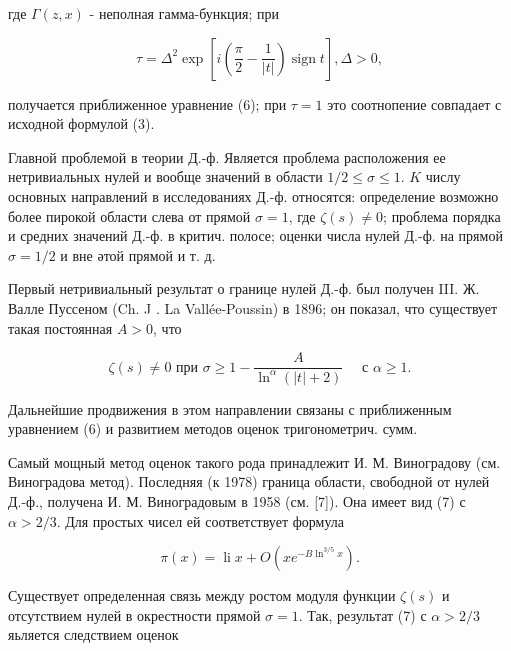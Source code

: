 \documentclass[10pt]{article}
\begin{document}
где $\Gamma(z, x)$ - неполная гамма-бункция; при



\[

\tau=\Delta^{2} \exp \left[i\left(\frac{\pi}{2}-\frac{1}{|t|}\right) \operatorname{sign} t\right], \Delta>0,

\]



получается приближенное уравнение (6); при $\tau=1$ это соотнопение совпадает с исходной формулой (3).



Главной проблемой в теории Д.-ф. Является проблема расположения ее нетривиальных нулей и вообще значений в области $1 / 2 \leqslant \sigma \leqslant 1$. $K$ числу основных направлений в исследованиях Д.-ф. относятся: определение возможно более пирокой области слева от прямой $\sigma=1$, где $\zeta(s) \neq 0$; проблема порядка и средних значений Д.-ф. в критич. полосе; оценки числа нулей Д.-ф. на прямой $\sigma=1 / 2$ и вне әтой прямой и т. д.



Первый нетривиальный результат о границе нулей Д.-ф. был получен III. Ж. Валле Пуссеном (Ch. J . La Vallée-Poussin) в 1896; он показал, что существует такая постоянная $A>0$, что



\[

\zeta(s) \neq 0 \text { при } \sigma \geqslant 1-\frac{A}{\ln ^{\alpha}(|t|+2)} \quad \text { с } \alpha \geqslant 1 .

\]



Дальнейшие продвижения в этом направлении связаны с приближенным уравнением (6) и развитием методов оценок тригонометрич. сумм.



Самый мощный метод оценок такого рода принадлежит И. М. Виноградову (см. Виноградова метод). Последняя (к 1978) граница области, свободной от нулей Д.-ф., получена И. М. Виноградовым в 1958 (см. [7]). Она имеет вид (7) с $\alpha>2 / 3$. Для простых чисел ей соответствует формула



\[

\pi(x)=\operatorname{li} x+O\left(x e^{-B \ln ^{3 / 5} x}\right) .

\]



Существует определенная связь между ростом модуля функции $\zeta(s)$ и отсутствием нулей в окрестности прямой $\sigma=1$. Так, результат (7) с $\alpha>2 / 3$ яьляется следствием оценок
\end{document}
